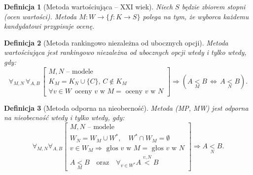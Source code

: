 \documentclass[12pt,a4paper]{article}
\theoremstyle{break}
\newtheorem{definition}{Definicja}[section]
\begin{document}
	\begin{definition}[Metoda wartościująca -- XXI wiek]
		Niech $S$ będzie zbiorem stopni (ocen wartości). Metoda $M: W \to \{ f: K \to S \}$ polega na tym, że wyborca każdemu kandydatowi przypisuje ocenę.
	\end{definition}

	\begin{definition}[Metoda rankingowo niezależna od ubocznych opcji]
		Metoda wartościująca jest rankingowo niezależna od ubocznych opcji wtedy i tylko wtedy, gdy:
		\[
		\forall_{ M, N} \, \forall_ {A, B} \, 
		\begin{bmatrix}
			M, N \text{ -- modele} \\
			K_M = K_N \cup \{C\}, \, C \notin K_M \\
			\forall v \in W \, \text{ oceny } v \text{ w } M = \text{ oceny } v \text{ w } N
		\end{bmatrix}
		\Rightarrow 
		(A \underset{M}{<} B \, \Leftrightarrow \, A \underset{N}{<} B).
		\]
	\end{definition}

		\begin{definition}[Metoda odporna na nieobecność]
		Metoda (MP, MW) jest odporna na nieobecność wtedy i tylko wtedy, gdy:
		\[
		\forall_{M,N} \forall_{A,B} 
		\begin{bmatrix}
			M, N \text{ -- modele} \\
			W_N = W_M \cup W^*, \quad W^* \cap W_M = \emptyset \\
			v \in W_M \Rightarrow \text{ głos } v \text{ w } M = \text{ głos } v \text{ w } N \\
			A \underset{M}{<} B \quad \text{oraz} \quad \forall_{v \in W^*} A \overset{v,N}{<}B
		\end{bmatrix}
		\Rightarrow A \underset{N}{<} B.
		\]
	\end{definition}
\end{document}
